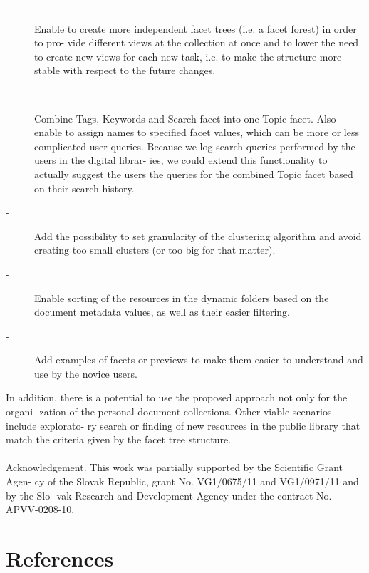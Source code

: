 \documentclass{llncs}
\begin{document}
\begin{description}
	
	\item [-] Enable to create more independent facet trees (i.e. a facet forest) in order to pro- vide different views at the collection at once and to lower the need to create new views for each new task, i.e. to make the structure more stable with respect to the future changes.
	\item [-] Combine Tags, Keywords and Search facet into one Topic facet. Also enable to assign names to specified facet values, which can be more or less complicated user queries. Because we log search queries performed by the users in the digital librar- ies, we could extend this functionality to actually suggest the users the queries for the combined Topic facet based on their search history.
	
	\item [-] Add the possibility to set granularity of the clustering algorithm and avoid creating too small clusters (or too big for that matter).
	\item [-] Enable sorting of the resources in the dynamic folders based on the document metadata values, as well as their easier filtering.
	
	\item [-] Add examples of facets or previews to make them easier to understand and use by the novice users.
\end{description}
In addition, there is a potential to use the proposed approach not only for the organi- zation of the personal document collections. Other viable scenarios include explorato- ry search or finding of new resources in the public library that match the criteria given by the facet tree structure.
\\ \\
Acknowledgement. This work was partially supported by the Scientific Grant Agen- cy of the Slovak Republic, grant No. VG1/0675/11 and VG1/0971/11 and by the Slo- vak Research and Development Agency under the contract No. APVV-0208-10.

\section*{References}
\end{document}
